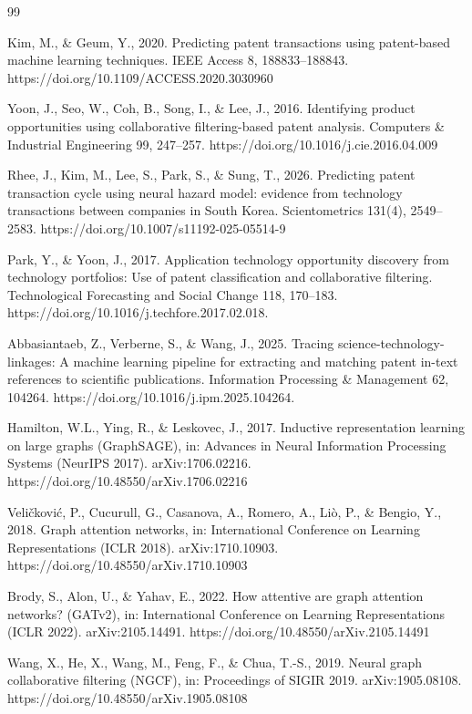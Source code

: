 \documentclass[preprint,12pt]{elsarticle}
\begin{document}
\begin{thebibliography}{99}

Kim, M., \& Geum, Y., 2020. Predicting patent transactions using patent-based machine learning techniques. IEEE Access 8, 188833--188843. https://doi.org/10.1109/ACCESS.2020.3030960

Yoon, J., Seo, W., Coh, B., Song, I., \& Lee, J., 2016. Identifying product opportunities using collaborative filtering-based patent analysis. Computers \& Industrial Engineering 99, 247--257. https://doi.org/10.1016/j.cie.2016.04.009

Rhee, J., Kim, M., Lee, S., Park, S., \& Sung, T., 2026. Predicting patent transaction cycle using neural hazard model: evidence from technology transactions between companies in South Korea. Scientometrics 131(4), 2549--2583. https://doi.org/10.1007/s11192-025-05514-9

Park, Y., \& Yoon, J., 2017. Application technology opportunity discovery from technology portfolios: Use of patent classification and collaborative filtering. Technological Forecasting and Social Change 118, 170--183. https://doi.org/10.1016/j.techfore.2017.02.018.

Abbasiantaeb, Z., Verberne, S., \& Wang, J., 2025. Tracing science-technology-linkages: A machine learning pipeline for extracting and matching patent in-text references to scientific publications. Information Processing \& Management 62, 104264. https://doi.org/10.1016/j.ipm.2025.104264.

Hamilton, W.L., Ying, R., \& Leskovec, J., 2017. Inductive representation learning on large graphs (GraphSAGE), in: Advances in Neural Information Processing Systems (NeurIPS 2017). arXiv:1706.02216. https://doi.org/10.48550/arXiv.1706.02216

Veli\v{c}kovi\'{c}, P., Cucurull, G., Casanova, A., Romero, A., Li\`{o}, P., \& Bengio, Y., 2018. Graph attention networks, in: International Conference on Learning Representations (ICLR 2018). arXiv:1710.10903. https://doi.org/10.48550/arXiv.1710.10903

Brody, S., Alon, U., \& Yahav, E., 2022. How attentive are graph attention networks? (GATv2), in: International Conference on Learning Representations (ICLR 2022). arXiv:2105.14491. https://doi.org/10.48550/arXiv.2105.14491

Wang, X., He, X., Wang, M., Feng, F., \& Chua, T.-S., 2019. Neural graph collaborative filtering (NGCF), in: Proceedings of SIGIR 2019. arXiv:1905.08108. https://doi.org/10.48550/arXiv.1905.08108


\end{thebibliography}
\end{document}
